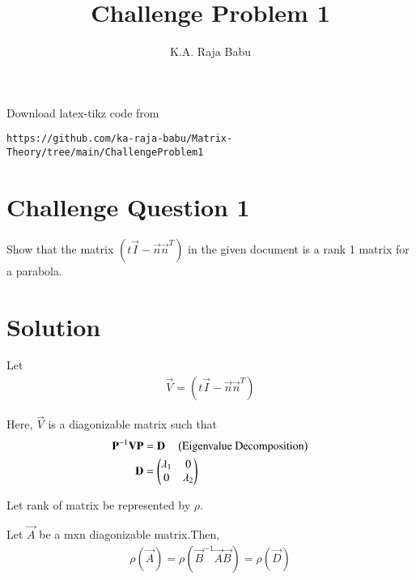 \documentclass[journal,12pt,twocolumn]{IEEEtran}
\begin{document}
     \def\rightbox#1{\makebox[0in][r]{#1}}
     \def\centbox#1{\makebox[0in]{#1}}
     \def\topbox#1{\raisebox{-\baselineskip}[0in][0in]{#1}}
     \def\midbox#1{\raisebox{-0.5\baselineskip}[0in][0in]{#1}}
\vspace{3cm}
\title{Challenge Problem 1}
\author{K.A. Raja Babu}
\maketitle
\newpage
\bigskip
\renewcommand{\thefigure}{\theenumi}
\renewcommand{\thetable}{\theenumi}
Download latex-tikz code from 
%
\begin{lstlisting}
https://github.com/ka-raja-babu/Matrix-Theory/tree/main/ChallengeProblem1
\end{lstlisting}
%
\section{Challenge Question 1}
Show that the matrix $(t\vec{I}-\vec{n}\vec{n}^T)$ in the given document is a rank 1 matrix for a parabola.
%
\section{Solution}
Let
\begin{align}
    \vec{V} = (t\vec{I}-\vec{n}\vec{n}^T) 
\end{align}

Here, $\vec{V}$ is a diagonizable matrix such that
\begin{align}
    \mathbf{P}^{-1}\mathbf{V}\mathbf{P} &= \mathbf{D}  \quad \left(\text{Eigenvalue Decomposition}\right)
    \\
    \mathbf{D} &= \begin{pmatrix}\lambda_1 & 0 \\ 0 & \lambda_2\end{pmatrix}
\end{align}

Let rank of matrix be represented by $\rho$.

\begin{lemma}
Let $\vec{A}$ be a mxn diagonizable matrix.Then,
\begin{align}
   \rho(\vec{A}) = \rho(\vec{B}^{-1}\vec{A}\vec{B}) = \rho(\vec{D}) \label{eqq1}
\end{align}
\end{lemma}
\end{document}

